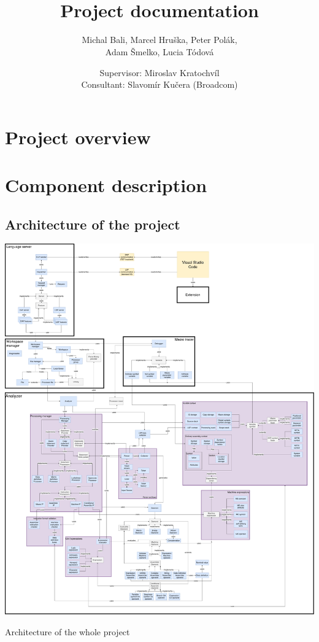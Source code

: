 \documentclass[10pt,a4paper]{report}
\title{\textcool{\bf High Level Assembler Plugin} \\ Project documentation}
\author{Michal Bali, Marcel Hruška, Peter Polák,\\ Adam Šmelko, Lucia Tódová}
\date{Supervisor: Miroslav Kratochvíl \\ \vspace{5mm} Consultant: Slavomír Kučera (Broadcom)}
\begin{document}
\maketitle

\tableofcontents



\part{Project overview}



\part{Component description}













 


\printindex
\begin{appendices}

\begin{foldoutfloat}
	\chapter{Architecture of the project}
	\label{all_arch}
	\thispagestyle{empty}

	\includegraphics[width=35cm]{img/all_arch}
	\caption{Architecture of the whole project}
\end{foldoutfloat}

\end{appendices}
\end{document}

